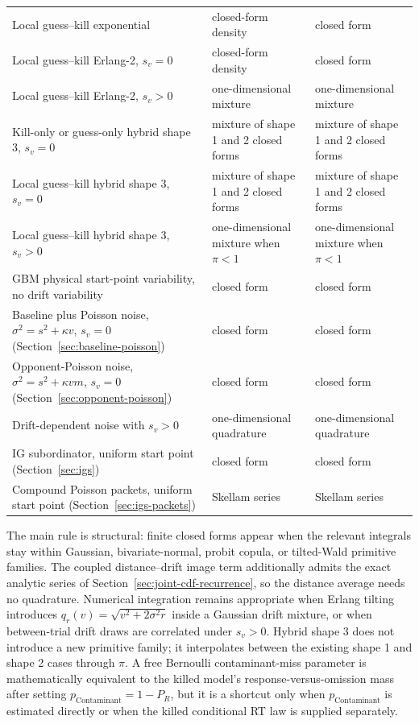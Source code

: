 \documentclass[12pt]{article}
\begin{document}
\begin{center}
\begin{tabular}{p{}p{}p{}}
Local guess--kill exponential & closed-form density & closed form \\
Local guess--kill Erlang-2, $s_v=0$ & closed-form density & closed form \\
Local guess--kill Erlang-2, $s_v>0$ & one-dimensional mixture & one-dimensional mixture \\
Kill-only or guess-only hybrid shape 3, $s_v=0$ & mixture of shape 1 and 2 closed forms & mixture of shape 1 and 2 closed forms \\
Local guess--kill hybrid shape 3, $s_v=0$ & mixture of shape 1 and 2 closed forms & mixture of shape 1 and 2 closed forms \\
Local guess--kill hybrid shape 3, $s_v>0$ & one-dimensional mixture when $\pi<1$ & one-dimensional mixture when $\pi<1$ \\
GBM physical start-point variability, no drift variability & closed form & closed form \\
Baseline plus Poisson noise, $\sigma^2=s^2+\kappa v$, $s_v=0$ (Section~\ref{sec:baseline-poisson}) & closed form & closed form \\
Opponent-Poisson noise, $\sigma^2=s^2+\kappa vm$, $s_v=0$ (Section~\ref{sec:opponent-poisson}) & closed form & closed form \\
Drift-dependent noise with $s_v>0$ & one-dimensional quadrature & one-dimensional quadrature \\
IG subordinator, uniform start point (Section~\ref{sec:igs}) & closed form & closed form \\
Compound Poisson packets, uniform start point (Section~\ref{sec:igs-packets}) & Skellam series & Skellam series \\
\bottomrule
\end{tabular}
\end{center}

The main rule is structural: finite closed forms appear when the relevant integrals stay within Gaussian, bivariate-normal, probit copula, or tilted-Wald primitive families. The coupled distance--drift image term additionally admits the exact analytic series of Section~\ref{sec:joint-cdf-recurrence}, so the distance average needs no quadrature. Numerical integration remains appropriate when Erlang tilting introduces $q_r(v)=\sqrt{v^2+2\sigma^2r}$ inside a Gaussian drift mixture, or when between-trial drift draws are correlated under $s_v > 0$. Hybrid shape 3 does not introduce a new primitive family; it interpolates between the existing shape 1 and shape 2 cases through $\pi$. A free Bernoulli contaminant-miss parameter is mathematically equivalent to the killed model's response-versus-omission mass after setting $p_{\mathrm{Contaminant}}=1-P_R$, but it is a shortcut only when $p_{\mathrm{Contaminant}}$ is estimated directly or when the killed conditional RT law is supplied separately.
\end{document}

